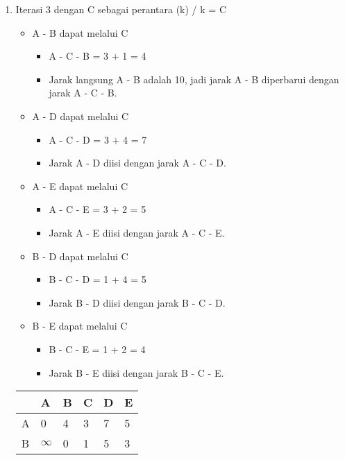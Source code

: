 \begin{enumerate}
    \item Iterasi 3 dengan C sebagai perantara (k) / k = C
    \begin{itemize}
        \item A - B dapat melalui C
        \begin{itemize}
            \item A - C - B = 3 + 1 = 4
            \item Jarak langsung A - B adalah 10, jadi jarak A - B diperbarui dengan jarak A - C - B.
        \end{itemize}
        \item A - D dapat melalui C
        \begin{itemize}
            \item A - C - D = 3 + 4 = 7
            \item Jarak A - D diisi dengan jarak A - C - D.
        \end{itemize}
        \item A - E dapat melalui C
        \begin{itemize}
            \item A - C - E = 3 + 2 = 5
            \item Jarak A - E diisi dengan jarak A - C - E.
        \end{itemize}
        \item B - D dapat melalui C
        \begin{itemize}
            \item B - C - D = 1 + 4 = 5
            \item Jarak B - D diisi dengan jarak B - C - D.
        \end{itemize}
        \item B - E dapat melalui C
        \begin{itemize}
            \item B - C - E = 1 + 2 = 4
            \item Jarak B - E diisi dengan jarak B - C - E.
        \end{itemize}
    \end{itemize}
    \begin{table}[h]
        \begin{tabular}{|l|l|l|l|l|l|}
        \hline
          & A        & B        & C        & D        & E        \\ \hline
        A & 0        & 4        & 3        & 7        & 5 \\ \hline
        B & $\infty$ & 0        & 1        & 5        & 3 \\ \hline

\end{tabular}
\end{table}
\end{enumerate}
